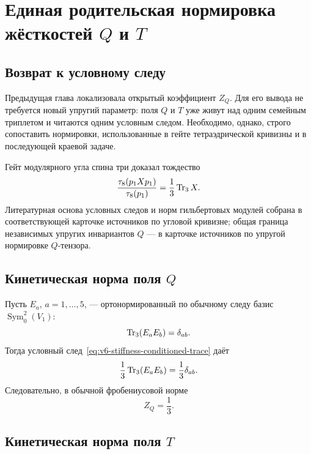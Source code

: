\chapter{Единая родительская нормировка жёсткостей
\texorpdfstring{$Q$ и $T$}{Q и T}}

\section{Возврат к условному следу}

Предыдущая глава локализовала открытый коэффициент $Z_Q$. Для его вывода
не требуется новый упругий параметр: поля $Q$ и $T$ уже живут над одним
семейным триплетом и читаются одним условным следом. Необходимо, однако,
строго сопоставить нормировки, использованные в гейте тетраэдрической
кривизны и в последующей краевой задаче.

Гейт модулярного угла спина три доказал тождество
\begin{equation}
 \frac{\tau_8(p_1Xp_1)}{\tau_8(p_1)}
 =\frac13\operatorname{Tr}_3X.
 \label{eq:v6-stiffness-conditioned-trace}
\end{equation}
Литературная основа условных следов и норм гильбертовых модулей собрана в
соответствующей карточке источников по угловой кривизне; общая граница
независимых упругих инвариантов $Q$ --- в карточке источников по упругой
нормировке $Q$-тензора.

\section{Кинетическая норма поля \texorpdfstring{$Q$}{Q}}

Пусть $E_a$, $a=1,\ldots,5$, --- ортонормированный по обычному следу базис
$\operatorname{Sym}_0^2(V_1)$:
\begin{equation}
 \operatorname{Tr}_3(E_aE_b)=\delta_{ab}.
\end{equation}
Тогда условный след~\eqref{eq:v6-stiffness-conditioned-trace} даёт
\begin{equation}
 \frac13\operatorname{Tr}_3(E_aE_b)=\frac13\delta_{ab}.
\end{equation}
Следовательно, в обычной фробениусовой норме
\begin{equation}
 Z_Q=\frac13.
 \label{eq:v6-canonical-ZQ}
\end{equation}

\section{Кинетическая норма поля \texorpdfstring{$T$}{T}}

